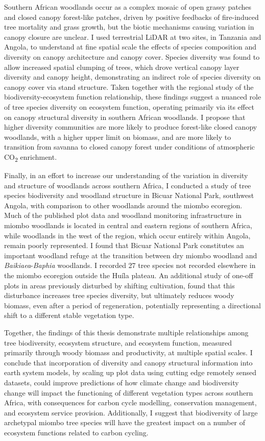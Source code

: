 Southern African woodlands occur as a complex mosaic of open grassy patches and closed canopy forest-like patches, driven by positive feedbacks of fire-induced tree mortality and grass growth, but the biotic mechanisms causing variation in canopy closure are unclear. I used terrestrial LiDAR at two sites, in Tanzania and Angola, to understand at fine spatial scale the effects of species composition and diversity on canopy architecture and canopy cover. Species diversity was found to allow increased spatial clumping of trees, which drove vertical canopy layer diversity and canopy height, demonstrating an indirect role of species diversity on canopy cover via stand structure. Taken together with the regional study of the biodiversity-ecosystem function relationship, these findings suggest a nuanced role of tree species diversity on ecosystem function, operating primarily via its effect on canopy structural diversity in southern African woodlands. I propose that higher diversity communities are more likely to produce forest-like closed canopy woodlands, with a higher upper limit on biomass, and are more likely to transition from savanna to closed canopy forest under conditions of atmospheric CO\textsubscript{2} enrichment.

Finally, in an effort to increase our understanding of the variation in diversity and structure of woodlands across southern Africa, I conducted a study of tree species biodiversity and woodland structure in Bicuar National Park, southwest Angola, with comparison to other woodlands around the miombo ecoregion. Much of the published plot data and woodland monitoring infrastructure in miombo woodlands is located in central and eastern regions of southern Africa, while woodlands in the west of the region, which occur entirely within Angola, remain poorly represented. I found that Bicuar National Park constitutes an important woodland refuge at the transition between dry miombo woodland and \textit{Baikiaea}-\textit{Baphia} woodlands. I recorded 27 tree species not recorded elsewhere in the miombo ecoregion outside the Hu\'{i}la plateau. An additional study of one-off plots in areas previously disturbed by shifting cultivation, found that this disturbance increases tree species diversity, but ultimately reduces woody biomass, even after a period of regeneration, potentially representing a directional shift to a different stable vegetation type.

Together, the findings of this thesis demonstrate multiple relationships among tree biodiversity, ecosystem structure, and ecosystem function, measured primarily through woody biomass and productivity, at multiple spatial scales. I conclude that incorporation of diversity and canopy structural information into earth system models, by scaling up plot data using cutting edge remotely sensed datasets, could improve predictions of how climate change and biodiversity change will impact the functioning of different vegetation types across southern Africa, with consequences for carbon cycle modelling, conservation management, and ecosystem service provision. Additionally, I suggest that biodiversity of large archetypal miombo tree species will have the greatest impact on a number of ecosystem functions related to carbon cycling.

